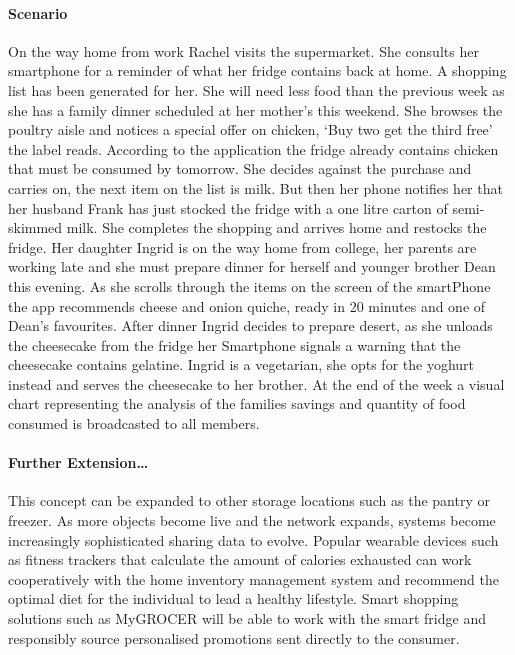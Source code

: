 \documentclass[a4paper, 11pt]{article}
\begin{document}
\paragraph{Scenario}On the way home from work Rachel visits the supermarket. She consults her smartphone for a reminder of what her fridge contains back at home. A shopping list has been generated for her. She will need less food than the previous week as she has a family dinner scheduled at her mother's this weekend. She browses the poultry aisle and notices a special offer on chicken, `Buy two get the third free' the label reads. According to the application the fridge already contains chicken that must be consumed by tomorrow. She decides against the purchase and carries on, the next item on the list is milk. But then her phone notifies her that her husband Frank has just stocked the fridge with a one litre carton of semi-skimmed milk. She completes the shopping and arrives home and restocks the fridge. Her daughter Ingrid is on the way home from college, her parents are working late and she must prepare dinner for herself and younger brother Dean this evening. As she scrolls through the items on the screen of the smartPhone the app recommends cheese and onion quiche, ready in 20 minutes and one of Dean's favourites. After dinner Ingrid decides to prepare desert, as she unloads the cheesecake from the fridge her Smartphone signals a warning that the cheesecake contains gelatine. Ingrid is a vegetarian, she opts for the yoghurt instead and serves the cheesecake to her brother. At the end of the week a visual chart representing the analysis of the families savings and quantity of food consumed is broadcasted to all members.

\paragraph{Further Extension\dots} This concept can be expanded to other storage locations such as the pantry or freezer. As more objects become live and the network expands, systems become increasingly sophisticated sharing data to evolve. Popular wearable devices such as fitness trackers that calculate the amount of calories exhausted can work cooperatively with the home inventory management system and recommend the optimal diet for the individual to lead a healthy lifestyle. Smart shopping solutions such as MyGROCER\cite{myGrocer} will be able to work with the smart fridge and responsibly source personalised promotions sent directly to the consumer.
\end{document}
